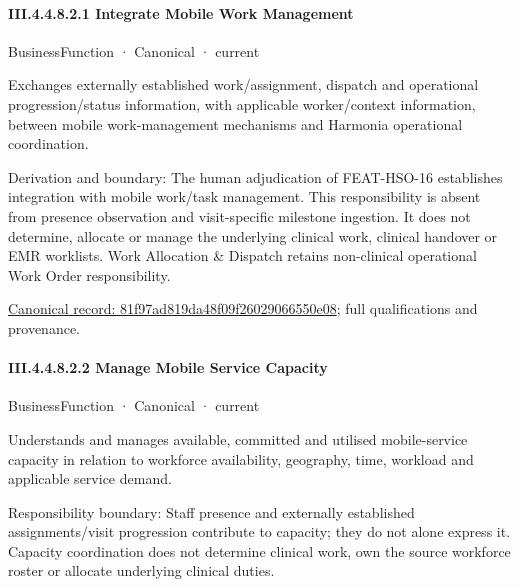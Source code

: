 \paragraph*{III.4.4.8.2.1 Integrate Mobile Work Management}
\label{navigation:III.4.4.8.2.1}

\label{element:81f97ad819da48f09f26029066550e08}
{\small BusinessFunction · Canonical · current}\par

Exchanges externally established work/assignment, dispatch and operational progression/status information, with applicable worker/context information, between mobile work-management mechanisms and Harmonia operational coordination.



Derivation and boundary: The human adjudication of FEAT-HSO-16 establishes integration with mobile work/task management. This responsibility is absent from presence observation and visit-specific milestone ingestion. It does not determine, allocate or manage the underlying clinical work, clinical handover or EMR worklists. Work Allocation \& Dispatch retains non-clinical operational Work Order responsibility.


{\footnotesize \href{../../../../continuum/business/business-function/81f97ad819da48f09f26029066550e08.md}{Canonical record: 81f97ad819da48f09f26029066550e08}; full qualifications and provenance.}\par
\paragraph*{III.4.4.8.2.2 Manage Mobile Service Capacity}
\label{navigation:III.4.4.8.2.2}

\label{element:ad5cb5451ef645acb55ceb0c942ea013}
{\small BusinessFunction · Canonical · current}\par

Understands and manages available, committed and utilised mobile-service capacity in relation to workforce availability, geography, time, workload and applicable service demand.



Responsibility boundary: Staff presence and externally established assignments/visit progression contribute to capacity; they do not alone express it. Capacity coordination does not determine clinical work, own the source workforce roster or allocate underlying clinical duties.


